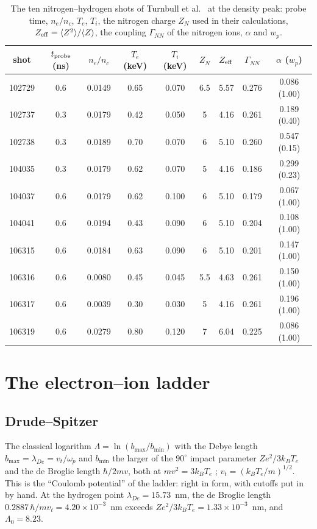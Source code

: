 \documentclass[11pt]{article}
\numberwithin{equation}{section}
\newcommand{\kB}{k_B}
\begin{document}
\begin{table}[ht]
\caption{The ten nitrogen--hydrogen shots of Turnbull et al.\ \cite{Turnbull2024} at the density
peak: probe time, $n_e/n_c$, $T_e$, $T_i$, the nitrogen charge $Z_N$ used in their calculations,
$Z_{\rm eff}=\langle Z^2\rangle/\langle Z\rangle$, the coupling $\Gamma_{NN}$ of the nitrogen ions,
$\alpha$ and $w_p$.}
\label{tab:mixshots}
\begin{center}
\begin{tabular}{ccccccccc}
\toprule
shot & $t_{\rm probe}$ (ns) & $n_e/n_c$ & $T_e$ (keV) & $T_i$ (keV) & $Z_N$ & $Z_{\rm eff}$ & $\Gamma_{NN}$ & $\alpha$ ($w_p$)\\
\midrule
102729 & 0.6 & 0.0149 & 0.65 & 0.070 & 6.5 & 5.57 & 0.276 & 0.086 (1.00)\\
102737 & 0.3 & 0.0179 & 0.42 & 0.050 & 5 & 4.16 & 0.261 & 0.189 (0.40)\\
102738 & 0.3 & 0.0189 & 0.70 & 0.070 & 6 & 5.10 & 0.260 & 0.547 (0.15)\\
104035 & 0.3 & 0.0179 & 0.62 & 0.070 & 5 & 4.16 & 0.186 & 0.299 (0.23)\\
104037 & 0.6 & 0.0179 & 0.62 & 0.100 & 6 & 5.10 & 0.179 & 0.067 (1.00)\\
104041 & 0.6 & 0.0194 & 0.43 & 0.090 & 6 & 5.10 & 0.204 & 0.108 (1.00)\\
106315 & 0.6 & 0.0184 & 0.63 & 0.090 & 6 & 5.10 & 0.201 & 0.147 (1.00)\\
106316 & 0.6 & 0.0080 & 0.45 & 0.045 & 5.5 & 4.63 & 0.261 & 0.150 (1.00)\\
106317 & 0.6 & 0.0039 & 0.30 & 0.030 & 5 & 4.16 & 0.261 & 0.196 (1.00)\\
106319 & 0.6 & 0.0279 & 0.80 & 0.120 & 7 & 6.04 & 0.225 & 0.086 (1.00)\\
\bottomrule
\end{tabular}
\end{center}
\end{table}

\section{The electron--ion ladder}
\label{sec:plasma}

\subsection{Drude--Spitzer}
\label{sec:drude}
The classical logarithm $\Lambda=\ln(b_{\max}/b_{\min})$ with the Debye length
$b_{\max}=\lambda_{De}=v_t/\omega_p$ and $b_{\min}$ the larger of the
$90^\circ$ impact parameter $Ze^2/3\kB T_e$ and the de Broglie length $\hbar/2mv$,
both at $mv^2=3\kB T_e$ \cite{Atzeni2004}; $v_t=(\kB T_e/m)^{1/2}$. This is the
``Coulomb potential'' of the ladder: right in form, with cutoffs put in by hand.
At the hydrogen point $\lambda_{De}=15.73$~nm, the de Broglie length
$0.2887\,\hbar/mv_t=4.20\times10^{-3}$~nm exceeds $Ze^2/3\kB T_e=1.33\times10^{-3}$~nm,
and $\Lambda_0=8.23$.
\end{document}
